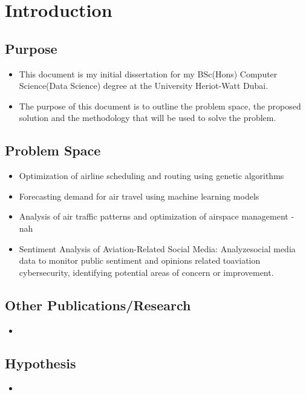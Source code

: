 \chapter{Introduction}

\section{Purpose}
\begin{itemize}
    \item This document is my initial dissertation for my BSc(Hons) Computer Science(Data Science) degree at the University Heriot-Watt Dubai.
    \item The purpose of this document is to outline the problem space, the proposed solution and the methodology that will be used to solve the problem.
\end{itemize}

\section{Problem Space}
\begin{itemize}
    \item Optimization of airline scheduling and routing using genetic algorithms
    \item Forecasting demand for air travel using machine learning models
    \item Analysis of air traffic patterns and optimization of airspace management - nah
    \item Sentiment Analysis of Aviation-Related Social Media: Analyzesocial media data to monitor public sentiment and opinions related toaviation cybersecurity, identifying potential areas of concern or improvement.
\end{itemize}

\section{Other Publications/Research}
\begin{itemize}
    \item
\end{itemize}

\section{Hypothesis}
\begin{itemize}
    \item
\end{itemize}

